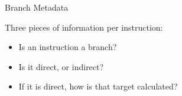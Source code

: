 \begin{frame}{Branch Metadata}

Three pieces of information per instruction:

\begin{itemize}
\item Is an instruction a branch?
\item Is it direct, or indirect?
\item If it is direct, how is that target calculated?
\end{itemize}

\end{frame}
